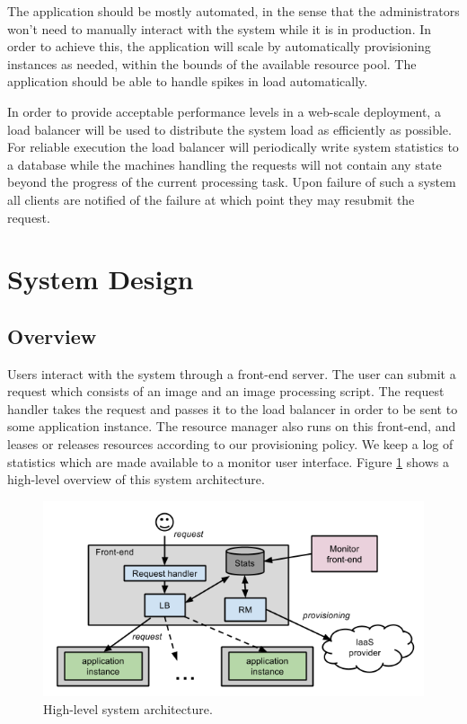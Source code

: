 \documentclass[conference]{IEEEtran}
\begin{document}
The application should be mostly automated, in the sense that the administrators won’t need to manually interact with the system while it is in production. In order to achieve this, the application will scale by automatically provisioning instances as needed, within the bounds of the available resource pool. The application should be able to handle spikes in load automatically.

In order to provide acceptable performance levels in a web-scale deployment, a load balancer will be used to distribute the system load as efficiently as possible. For reliable execution the load balancer will periodically write system statistics to a database while the machines handling the requests will not contain any state beyond the progress of the current processing task. Upon failure of such a system all clients are notified of the failure at which point they may resubmit the request.


\section{System Design}

\subsection{Overview}

Users interact with the system through a front-end server. The user can submit a request which consists of an image and an image processing script. The request handler takes the request and passes it to the load balancer in order to be sent to some application instance. The resource manager also runs on this front-end, and leases or releases resources according to our provisioning policy. We keep a log of statistics which are made available to a monitor user interface. Figure \ref{fig-arch} shows a high-level overview of this system architecture.

\begin{figure}
  \centering
    \includegraphics[width=140mm]{architecture_crop.png}
  \caption{High-level system architecture.}
  \label{fig-arch}
\end{figure}
\end{document}
